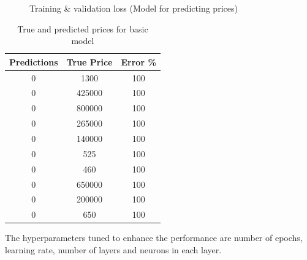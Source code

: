\documentclass[12pt,twoside]{report}
\begin{document}
\begin{figure}[!htbp]
	\hfil
	\caption{Training \& validation loss (Model for predicting prices)}
	\label{all_complex_full_epoch_1000}
\end{figure}

\begin{table}[!htbp]
	\centering
	\caption{ True and predicted prices for basic model}
	\label{complex_model_prediction_price}
	\begin{tabular}{| c | c | c |}
		\hline
		Predictions & True Price & Error \% \\
		\hline
		0 & 1300 & 100 \\
		\hline
		0 & 425000 & 100 \\
		\hline
		0 & 800000 & 100 \\
		\hline
		0 & 265000 & 100 \\
		\hline
		0 & 140000 & 100 \\
		\hline
		0 & 525 & 100 \\
		\hline
		0 & 460 & 100 \\ 
		\hline
		0 & 650000 & 100 \\
		\hline
		0 & 200000 & 100 \\
		\hline
		0 & 650 & 100 \\
		\hline
	\end{tabular}
\end{table}

The hyperparameters tuned to enhance the performance are number of epochs, learning rate, number of layers and neurons in each layer. 
\end{document}
